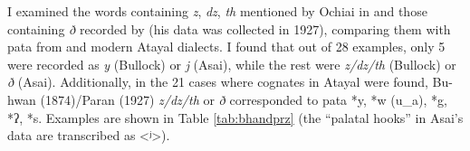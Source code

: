 I examined the words containing \textit{z}, \textit{dz}, \textit{th} mentioned by Ochiai in \textcite{bullock1874formosan} and those containing \textit{ð} recorded by \textcite{asai1953sedik} (his data was collected in 1927), comparing them with \acl{pata} from \textcite{goderich2020phd} and modern Atayal dialects. I found that out of 28 examples, only 5 were recorded as \textit{y} (Bullock) or \textit{j} (Asai), while the rest were \textit{z/dz/th} (Bullock) or \textit{ð} (Asai). Additionally, in the 21 cases where cognates in Atayal were found, Bu-hwan (1874)/Paran (1927) \textit{z/dz/th} or \textit{ð} corresponded to \acl{pata} *y, *w (u\_a), *g, *ʔ, *s. Examples are shown in Table \ref{tab:bhandprz} (the ``palatal hooks'' in Asai's data are transcribed as <ʲ>).

\begingroup
{}
\renewcommand\arraystretch{1.25}
